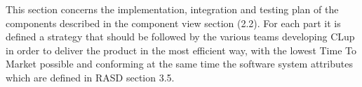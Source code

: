 \documentclass[../../main.tex]{subfiles}
\begin{document}
This section concerns the implementation, integration and testing plan of the components described in the component view section (2.2).
For each part it is defined a strategy that should be followed by the various teams developing CLup in order to deliver the product in 
the most efficient way, with the lowest Time To Market possible and conforming at the same time the software system attributes which 
are defined in RASD section 3.5.
\end{document}
